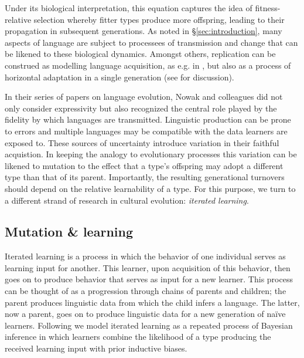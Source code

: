 \documentclass[a4paper]{article}
\begin{document}
Under its biological interpretation, this equation captures the idea of fitness-relative selection whereby fitter types produce more offspring, leading to their propagation in subsequent generations. As noted in \S\ref{sec:introduction}, many aspects of language are subject to processees of transmission and change that can be likened to these biological dynamics. Amongst others, replication can be construed as modelling language acquisition, as e.g. in \citealt{nowak+etal:2002}, but also as a process of horizontal adaptation in a single generation (see \citealt[\S3.3]{benz+etal:2005b} for discussion).

In their series of papers on language evolution, Nowak and colleagues did not only consider expressivity but also recognized the central role played by the fidelity by which languages are transmitted. Linguistic production can be prone to errors and multiple languages may be compatible with the data learners are exposed to. These sources of uncertainty introduce variation in their faithful acquistion. In keeping the analogy to evolutionary processes this variation can be likened to mutation to the effect that a type's offspring may adopt a different type than that of its parent. Importantly, the resulting generational turnovers should depend on the relative learnability of a type. For this purpose, we turn to a different strand of research in cultural evolution: {\em iterated learning}. 


\subsection{Mutation \& learning}\label{sec:learnability}
Iterated learning is a process in which the behavior of one individual serves as learning input for another. This learner, upon acquisition of this behavior, then goes on to produce behavior that serves as input for a new learner. This process can be thought of as a progression through chains of parents and children; the parent produces linguistic data from which the child infers a language. The latter, now a parent, goes on to produce linguistic data for a new generation of na\"ive learners. Following \citet{griffiths+kalish:2007} we model iterated learning as a repeated process of Bayesian inference in which learners combine the likelihood of a type producing the received learning input with prior inductive biases. 
\end{document}
